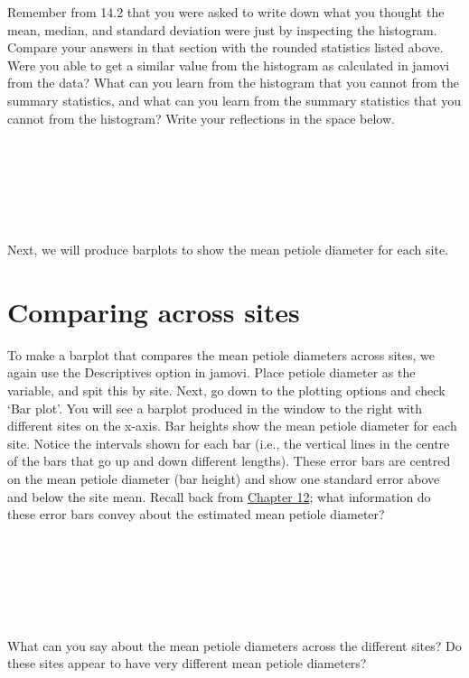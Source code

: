 \documentclass[
]{scrbook}
\begin{document}
Remember from 14.2 that you were asked to write down what you thought the mean, median, and standard deviation were just by inspecting the histogram.
Compare your answers in that section with the rounded statistics listed above.
Were you able to get a similar value from the histogram as calculated in jamovi from the data?
What can you learn from the histogram that you cannot from the summary statistics, and what can you learn from the summary statistics that you cannot from the histogram?
Write your reflections in the space below.

\begin{verbatim}






\end{verbatim}

Next, we will produce barplots to show the mean petiole diameter for each site.

\hypertarget{comparing-across-sites}{%
\section{Comparing across sites}\label{comparing-across-sites}}

To make a barplot that compares the mean petiole diameters across sites, we again use the Descriptives option in jamovi.
Place petiole diameter as the variable, and spit this by site.
Next, go down to the plotting options and check `Bar plot'.
You will see a barplot produced in the window to the right with different sites on the x-axis.
Bar heights show the mean petiole diameter for each site.
Notice the intervals shown for each bar (i.e., the vertical lines in the centre of the bars that go up and down different lengths).
These error bars are centred on the mean petiole diameter (bar height) and show one standard error above and below the site mean.
Recall back from \protect\hyperlink{Chapter_12}{Chapter 12}; what information do these error bars convey about the estimated mean petiole diameter?

\begin{verbatim}






\end{verbatim}

What can you say about the mean petiole diameters across the different sites?
Do these sites appear to have very different mean petiole diameters?

\begin{verbatim}






\end{verbatim}
\end{document}

